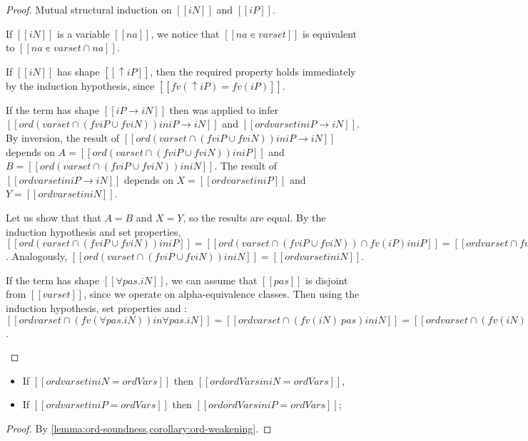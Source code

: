\begin{proof}
  Mutual structural induction on $[[iN]]$ and $[[iP]]$.

  \begin{caseof}
    \item If $[[iN]]$ is a variable $[[na]]$,
      we notice that $[[na ∊ varset]]$ 
      is equivalent to $[[na ∊ varset ∩ {na}]]$.
    \item If $[[iN]]$ has shape $[[↑iP]]$, then
      the required property holds immediately by the 
      induction hypothesis, since 
      $[[fv(↑iP) = fv(iP)]]$.
    \item If the term has shape $[[iP → iN]]$ then
       was applied
      to infer $[[ ord (varset ∩ (fv iP ∪ fv iN)) in iP → iN ]]$
      and $[[ ord varset in iP → iN]]$. 
      By inversion, the result of 
      $[[ ord (varset ∩ (fv iP ∪ fv iN)) in iP → iN ]]$
      depends on 
      $A = [[ ord (varset ∩ (fv iP ∪ fv iN)) in iP]]$
      and 
      $B = [[ ord (varset ∩ (fv iP ∪ fv iN)) in iN]]$.
      The result of
       $[[ ord varset in iP → iN]]$ 
       depends on 
      $X = [[ord varset in iP]]$ and
      $Y = [[ord varset in iN]]$.

      Let us show that that $A = B$ and $X = Y$, so the results are equal. 
      By the induction hypothesis and set properties,
      $[[ ord (varset ∩ (fv iP ∪ fv iN)) in iP ]] = 
       [[ ord (varset ∩ (fv iP ∪ fv iN)) ∩ fv(iP) in iP ]] = 
       [[ ord varset ∩ fv(iP) in iP ]] = 
       [[ ord varset in iP ]]$.
      Analogously, 
      $[[ ord (varset ∩ (fv iP ∪ fv iN)) in iN ]] = 
       [[ ord varset in iN ]]$.
    \item If the term has shape $[[∀pas.iN]]$,
      we can assume that $[[pas]]$ is disjoint
      from $[[varset]]$,
      since we operate on alpha-equivalence classes.
      Then using the induction hypothesis,
      set properties and : 
      $[[ord varset ∩ (fv(∀pas.iN)) in ∀pas.iN]] =
       [[ord varset ∩ (fv(iN) \ {pas}) in iN]] =
       [[ord varset ∩ (fv(iN) \ {pas}) ∩ fv(iN) in iN]] =
       [[ord varset ∩ fv(iN) in iN]] =
       [[ord varset in iN]]$.
  \end{caseof}
\end{proof}

\begin{corollary}
  \label{corollary:ord-idemp}
  \hfill
  \begin{itemize}
    \item[$-$] If $[[ ord varset in iN = ordVars ]]$ then 
      $[[ ord {ordVars} in iN = ordVars ]]$,
    \item[$+$] If $[[ ord varset in iP = ordVars ]]$ then 
      $[[ ord {ordVars} in iP = ordVars ]]$;
  \end{itemize}
\end{corollary}
\begin{proof}
  By \cref{lemma:ord-soundness,corollary:ord-weakening}.
\end{proof}
  


